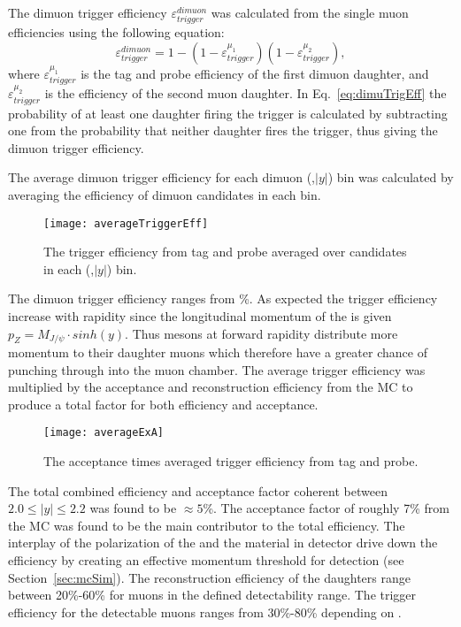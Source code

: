       The dimuon trigger efficiency $\varepsilon^{dimuon}_{trigger}$ was 
        calculated from the single muon efficiencies using the following
        equation:
      \begin{equation}
        \label{eq:dimuTrigEff}
        \varepsilon^{dimuon}_{trigger}=1-(1-\varepsilon_{trigger}^{\mu_{1}})(1-\varepsilon_{trigger}^{\mu_{2}}),
      \end{equation}
      where $\varepsilon_{trigger}^{\mu_{1}}$ is the tag and probe efficiency
        of the first dimuon daughter, and $\varepsilon_{trigger}^{\mu_{2}}$ is
        the efficiency of the second muon daughter. 
      In Eq.~\ref{eq:dimuTrigEff} the probability of at least one daughter
        firing the trigger is calculated by subtracting one from the
        probability that neither daughter fires the trigger,
        thus giving the dimuon trigger efficiency. 

      The average dimuon trigger efficiency for each dimuon (\pt{},$|y|$) bin
        was calculated by averaging the efficiency of dimuon candidates in each
        bin. 
      \begin{figure}[!Hhbt]
        \centering
        \texttt{[image: averageTriggerEff]}
        \caption{The trigger efficiency from tag and probe averaged over candidates
          in each (\pt{},$|y|$) bin.}
        \label{fig:avTrigEffCo}
      \end{figure}
      The dimuon trigger efficiency ranges from \DIFdelbegin {}\DIFdelend \DIFaddbegin {}\DIFaddend \%. 
      As expected the \JPsi{} trigger efficiency increase with rapidity since 
        the longitudinal momentum of the \JPsi{} is given 
        $p_Z= M_{J/\psi} \cdot sinh(y)$. 
      Thus \JPsi{} mesons at forward rapidity distribute more momentum to their
        daughter muons which therefore have a greater chance of punching 
        through into the muon chamber.  
      The average trigger efficiency was multiplied by the acceptance and 
        reconstruction efficiency from the MC to produce a total factor for 
        both efficiency and acceptance. 
      \begin{figure}[!Hhtb]
        \centering
        \texttt{[image: averageExA]}
        \caption{The acceptance times averaged trigger efficiency from tag and 
          probe.}
        \label{fig:avAccEff}
      \end{figure}

      The total combined efficiency and acceptance factor coherent \JPsi{} 
        between $2.0 \le |y| \le 2.2$ was found to be $\approx 5$\%.
      The acceptance factor of roughly 7\% from the MC was found to be the main
        contributor to the total efficiency. 
      The interplay of the polarization of the \JPsi{} and the material in 
        detector drive down the efficiency by creating an effective momentum 
        threshold for detection (see Section~\ref{sec:mcSim}).
      The reconstruction efficiency of the daughters range between 
        20\%-60\% for muons in the defined detectability range. 
      The trigger efficiency for the detectable muons ranges from 30\%-80\% 
        depending on \pt{}. 

